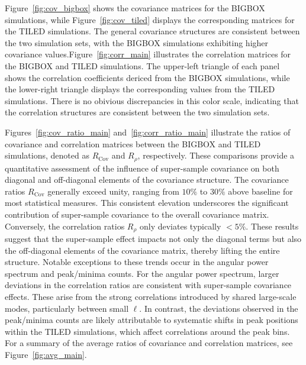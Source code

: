 Figure~\ref{fig:cov_bigbox} shows the covariance matrices for the BIGBOX simulations, while Figure~\ref{fig:cov_tiled} displays the corresponding matrices for the TILED simulations. The general covariance structures are consistent between the two simulation sets, with the BIGBOX simulations exhibiting higher covariance values.Figure~\ref{fig:corr_main} illustrates the correlation matrices for the BIGBOX and TILED simulations. The upper-left triangle of each panel shows the correlation coefficients dericed from the BIGBOX simulations, while the lower-right triangle displays the corresponding values from the TILED simulations. There is no obivious discrepancies in this color scale, indicating that the correlation structures are consistent between the two simulation sets.

Figures~\ref{fig:cov_ratio_main} and~\ref{fig:corr_ratio_main} illustrate the ratios of covariance and correlation matrices between the BIGBOX and TILED simulations, denoted as $R_{\text{Cov}}$ and $R_{\rho}$, respectively. These comparisons provide a quantitative assessment of the influence of super-sample covariance on both diagonal and off-diagonal elements of the covariance structure. The covariance ratios $R_{\text{Cov}}$ generally exceed unity, ranging from $10\%$ to $30\%$ above baseline for most statistical measures. This consistent elevation underscores the significant contribution of super-sample covariance to the overall covariance matrix. Conversely, the correlation ratios $R_{\rho}$ only deviates typically $ < 5\%$. These results suggest that the super-sample effect impacts not only the diagonal terms but also the off-diagonal elements of the covariance matrix, thereby lifting the entire structure. Notable exceptions to these trends occur in the angular power spectrum and peak/minima counts. For the angular power spectrum, larger deviations in the correlation ratios are consistent with super-sample covariance effects. These arise from the strong correlations introduced by shared large-scale modes, particularly between small $\ell$. In contrast, the deviations observed in the peak/minima counts are likely attributable to systematic shifts in peak positions within the TILED simulations, which affect correlations around the peak bins. For a summary of the average ratios of covariance and correlation matrices, see Figure~\ref{fig:avg_main}.

